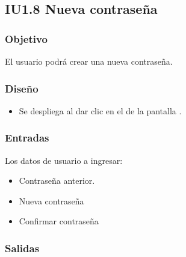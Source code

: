 \newpage
\subsection{IU1.8 Nueva contraseña}

\subsubsection{Objetivo}
	El usuario podrá crear una nueva contraseña.
\subsubsection{Diseño}
	\begin{itemize}
		\item Se despliega al dar clic en el  de la pantalla .
\end{itemize}		


\subsubsection{Entradas}
Los datos de usuario a ingresar:
\begin{itemize}
	\item Contraseña anterior.
	\item Nueva contraseña
	\item Confirmar contraseña
\end{itemize}

\subsubsection{Salidas}
\begin{Citemize}
	\item {}
	\item {}
	\item {}
	\item {}
\end{Citemize}
